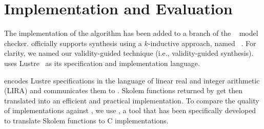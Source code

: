 \section{Implementation and Evaluation}
\label{sec:impl}

The implementation of the algorithm has been added to a branch of the  \jkind~\cite{jkind} model checker.  \jkind officially supports synthesis
using a $k$-inductive approach, named \jsyn~\cite{KatisFGBGW16}. For clarity, we named
our validity-guided technique \jsynvg (i.e., validity-guided synthesis). \jkind uses Lustre~\cite{lustrev6} as its specification and implementation language.
\iffalse
, which functions as an intermediate representation to the Architecture Analysis and Design Language (\textsc{AADL})~\cite{feiler2006architecture}.
The latter is a high-level specification and analysis language with which
contracts are expressed, using the Assume-Guarantee Reasoning (\textsc{AGREE})
framework~\cite{NFM2012:CoGaMiWhLaLu}.
\andrew{it seems strange to be talking about AADL and maybe even AGREE  at all here.}

\fi
%
\jsynvg encodes Lustre specifications in the language of
linear real and integer arithmetic (LIRA)
and communicates them to \aeval.
%
%
Skolem functions returned by \aeval get then translated %
into an efficient and practical implementation. To compare the quality of implementations against \jsyn, we use
\smtlibtoc, a tool that has been specifically developed to translate
  Skolem functions to C implementations.




